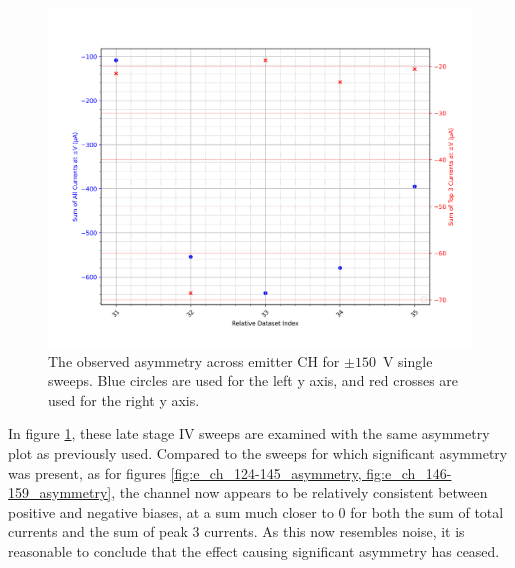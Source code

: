 \begin{refsection}
\begin{figure}[H]
    \centering
    \includegraphics[width=\linewidth]{Chapter7/Figs/Raster/Emitters/160-164_asymmetry.png}
    \caption{The observed asymmetry across emitter CH for $\pm150$~\si{\volt} single sweeps. Blue circles are used for the left y axis, and red crosses are used for the right y axis.}
    \label{fig:e_ch_160-164_asymmetry}
\end{figure}

In figure \ref{fig:e_ch_160-164_asymmetry}, these late stage IV sweeps are examined with the same asymmetry plot as previously used. Compared to the sweeps for which significant asymmetry was present, as for figures \ref{fig:e_ch_124-145_asymmetry, fig:e_ch_146-159_asymmetry}, the channel now appears to be relatively consistent between positive and negative biases, at a sum much closer to 0 for both the sum of total currents and the sum of peak 3 currents. As this now resembles noise, it is reasonable to conclude that the effect causing significant asymmetry has ceased.


\end{refsection}
